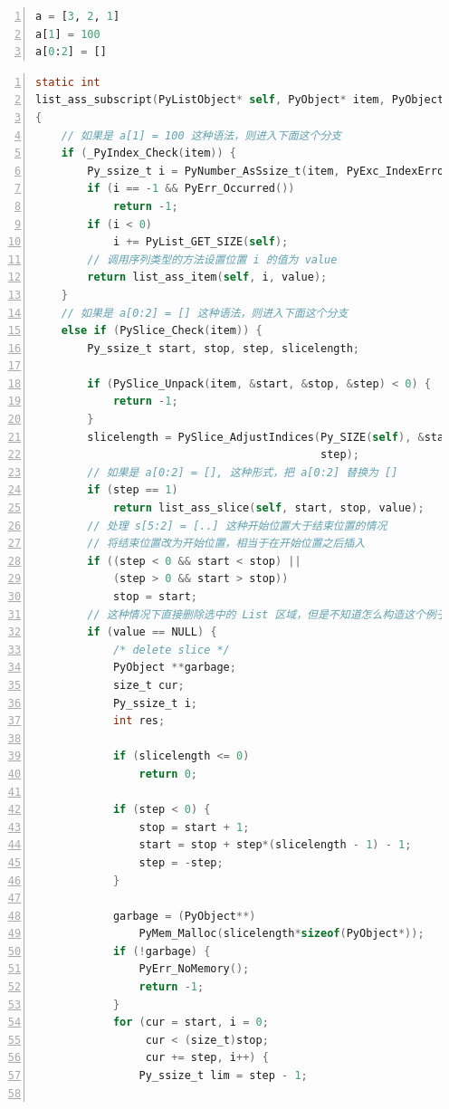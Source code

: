 \begin{lstlisting}[language=Python, numbers=left, numbersep=1em, numberstyle=\footnotesize , breaklines=true]
a = [3, 2, 1]
a[1] = 100
a[0:2] = []
\end{lstlisting}

\begin{lstlisting}[language=C, numbers=left, numbersep=1em, numberstyle=\footnotesize , breaklines=true]
static int
list_ass_subscript(PyListObject* self, PyObject* item, PyObject* value)
{
    // 如果是 a[1] = 100 这种语法，则进入下面这个分支
    if (_PyIndex_Check(item)) {
        Py_ssize_t i = PyNumber_AsSsize_t(item, PyExc_IndexError);
        if (i == -1 && PyErr_Occurred())
            return -1;
        if (i < 0)
            i += PyList_GET_SIZE(self);
        // 调用序列类型的方法设置位置 i 的值为 value
        return list_ass_item(self, i, value);
    }
    // 如果是 a[0:2] = [] 这种语法，则进入下面这个分支
    else if (PySlice_Check(item)) {
        Py_ssize_t start, stop, step, slicelength;

        if (PySlice_Unpack(item, &start, &stop, &step) < 0) {
            return -1;
        }
        slicelength = PySlice_AdjustIndices(Py_SIZE(self), &start, &stop,
                                            step);
        // 如果是 a[0:2] = [], 这种形式，把 a[0:2] 替换为 []
        if (step == 1)
            return list_ass_slice(self, start, stop, value);
        // 处理 s[5:2] = [..] 这种开始位置大于结束位置的情况
        // 将结束位置改为开始位置，相当于在开始位置之后插入
        if ((step < 0 && start < stop) ||
            (step > 0 && start > stop))
            stop = start;
        // 这种情况下直接删除选中的 List 区域，但是不知道怎么构造这个例子
        if (value == NULL) {
            /* delete slice */
            PyObject **garbage;
            size_t cur;
            Py_ssize_t i;
            int res;

            if (slicelength <= 0)
                return 0;

            if (step < 0) {
                stop = start + 1;
                start = stop + step*(slicelength - 1) - 1;
                step = -step;
            }

            garbage = (PyObject**)
                PyMem_Malloc(slicelength*sizeof(PyObject*));
            if (!garbage) {
                PyErr_NoMemory();
                return -1;
            }
            for (cur = start, i = 0;
                 cur < (size_t)stop;
                 cur += step, i++) {
                Py_ssize_t lim = step - 1;


\end{lstlisting}
